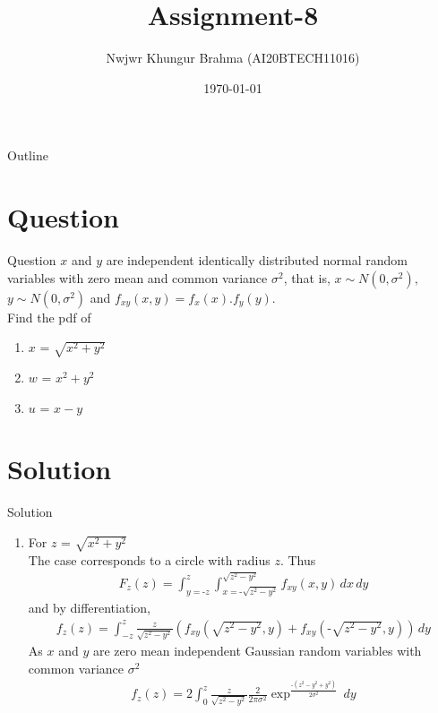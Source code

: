 \documentclass{beamer}
\title{Assignment-8}
\author{Nwjwr Khungur Brahma (AI20BTECH11016)}
\date{\today}
\newcounter{currentenumi}
\begin{document}
\begin{frame}
\titlepage
\end{frame}

\begin{frame}{Outline}
\tableofcontents
\end{frame}

\section{Question}
\begin{frame}{Question}
$x$ and $y$ are independent identically distributed normal random variables with zero mean and common variance $\sigma^{2}$, that is, $x  \sim N(0,\sigma^{2}),$ $y \sim N(0,\sigma^{2})$ and $f_{xy}(x,y)= f_x(x).f_y(y).$\\
Find the pdf of
\begin{enumerate}
\item $x$ = $\sqrt{x^{2}+y^{2}}$
\item $w$ = $x^{2}+y^{2}$
\item $u$ = $x - y$
\end{enumerate}
\end{frame}

\section{Solution}
\begin{frame}{Solution}
\begin{enumerate}
\item For $z$ = $\sqrt{x^{2}+y^{2}}$\\ 
The case corresponds to a circle with radius $z$. Thus
\begin{align}
F_z(z)= \int_{y=\text{-}z}^{z} \int_{x=\text{-}\sqrt{z^{2}-y^{2}}}^{\sqrt{z^{2}-y^{2}}} f_{xy}(x,y)\,dx \,dy
\end{align}
and by differentiation,
\begin{align}
f_z(z)= \int_{-z}^{z} \frac{z}{\sqrt{z^{2}-y^{2}}} \left(f_{xy}(\sqrt{z^{2}-y^{2}},y)+f_{xy}(\text{-}\sqrt{z^{2}-y^{2}},y)\right) \,dy
\end{align}
As $x$ and $y$ are zero mean independent Gaussian random variables with common variance $\sigma^{2}$
\begin{align}
f_z(z)= 2 \int_{0}^{z} \frac{z}{\sqrt{z^{2}-y^{2}}}\frac{2}{2 \pi \sigma^{2}} \exp^{\frac{\text{-}(z^{2}-y^2+y^2)}{2 \sigma^2}} \,dy
\end{align}
\setcounter{currentenumi}{\theenumi}
\end{enumerate}
\end{frame}
\end{document}

